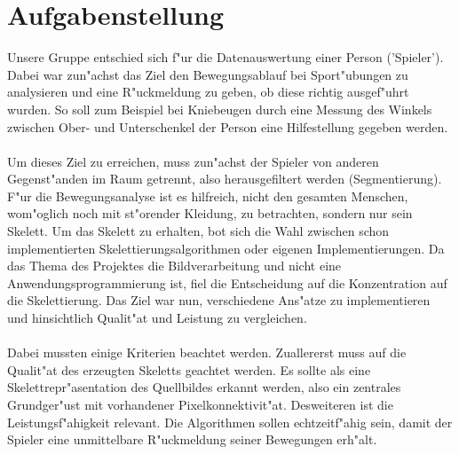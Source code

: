 \section{Aufgabenstellung}
\label{aufgabenstellung}
Unsere Gruppe entschied sich f"ur die Datenauswertung einer Person ('Spieler'). Dabei war zun"achst das Ziel den Bewegungsablauf bei Sport"ubungen zu analysieren und eine R"uckmeldung zu geben, ob diese richtig ausgef"uhrt wurden. So soll zum Beispiel bei Kniebeugen durch eine Messung des Winkels zwischen Ober- und Unterschenkel der Person eine Hilfestellung gegeben werden. \\ \\ 
Um dieses Ziel zu erreichen, muss zun"achst der Spieler von anderen Gegenst"anden im Raum getrennt, also herausgefiltert werden (Segmentierung). F"ur die Bewegungsanalyse ist es hilfreich, nicht den gesamten Menschen, wom"oglich noch mit st"orender Kleidung, zu betrachten, sondern nur sein Skelett. Um das Skelett zu erhalten, bot sich die Wahl zwischen schon implementierten Skelettierungsalgorithmen oder eigenen Implementierungen. Da das Thema des Projektes die Bildverarbeitung und nicht eine Anwendungsprogrammierung ist, fiel die Entscheidung auf die Konzentration auf die Skelettierung. Das Ziel war nun, verschiedene Ans"atze zu implementieren und hinsichtlich Qualit"at und Leistung zu vergleichen.  \\ \\
Dabei mussten einige Kriterien beachtet werden. Zuallererst muss auf die Qualit"at des erzeugten Skeletts geachtet werden. Es sollte als eine Skelettrepr"asentation des Quellbildes erkannt werden, also ein zentrales Grundger"ust mit vorhandener Pixelkonnektivit"at. Desweiteren ist die Leistungsf"ahigkeit relevant. Die Algorithmen sollen echtzeitf"ahig sein, damit der Spieler eine unmittelbare R"uckmeldung seiner Bewegungen erh"alt.
